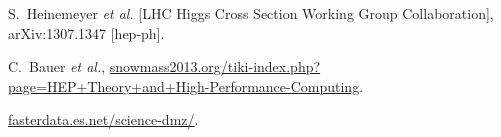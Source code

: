 \begin{thebibliography}{99}
  S.~Heinemeyer {\it et al.}  [LHC Higgs Cross Section Working Group Collaboration],
  arXiv:1307.1347 [hep-ph].

C.~Bauer {\it et al.},
\url{snowmass2013.org/tiki-index.php?page=HEP+Theory+and+High-Performance-Computing}.


\url{fasterdata.es.net/science-dmz/}.

\end{thebibliography}
